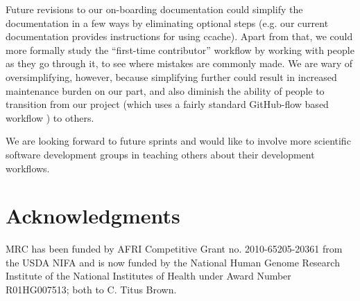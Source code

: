 \documentclass[11pt]{article}
\begin{document}
Future revisions to our on-boarding documentation could simplify the
documentation in a few ways by eliminating optional steps (e.g. our
current documentation provides instructions for using ccache).  Apart
from that, we could more formally study the ``first-time contributor''
workflow by working with people as they go through it, to see where
mistakes are commonly made.  We are wary of oversimplifying, however,
because simplifying further could result in increased maintenance
burden on our part, and also diminish the ability of people to
transition from our project (which uses a fairly standard GitHub-flow
based workflow \cite{githubflow}) to others.

We are looking forward to future sprints and would like to involve more
scientific software development groups in teaching others about their
development workflows.



\section*{Acknowledgments}

MRC has been funded by AFRI Competitive Grant no. 2010-65205-20361
from the USDA NIFA and is now funded by the National Human Genome
Research Institute of the National Institutes of Health under Award
Number R01HG007513; both to C. Titus Brown.



\end{document}
